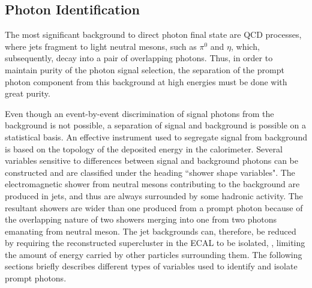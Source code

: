 \subsection{Photon Identification}\label{Se:photonId}
The most significant background to direct photon final state are QCD processes, where jets fragment to light neutral mesons, such as $\pi^{0}$ and 
$\eta$, which, subsequently, decay into a pair of overlapping photons. Thus, in order to maintain purity of the photon signal selection, 
the separation of the prompt photon component from this background at high energies must be done with great purity. 

Even though an event-by-event discrimination of signal photons from the background is not possible, a separation of signal and background is possible 
on a statistical basis. An effective instrument used to segregate signal from background is based on the topology of the deposited energy in the
calorimeter. Several variables sensitive to differences between signal and background photons can be constructed and are classified under the heading
``shower shape variables". The electromagnetic shower from neutral mesons contributing to the background are produced in jets, and thus are always 
surrounded by some hadronic activity. The resultant showers are wider than one produced from a prompt photon because of the overlapping nature of two 
showers merging into one from two photons emanating from neutral meson. The jet backgrounds can, therefore, be reduced by requiring the reconstructed 
supercluster in the ECAL to be isolated, \ie, limiting the amount of energy carried by other particles surrounding them. The following sections briefly 
describes different types of variables used to identify and isolate prompt photons.


